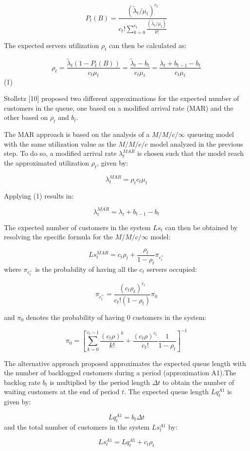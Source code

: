 $$ P_t(B) = \frac{(\widetilde{\lambda}_t / \mu_t)^{c_t}}{c_t!\sum_{k=0}^{c_t} \frac{(\widetilde{\lambda}_t / \mu_t)}{k!} } $$

The expected servers utilization $ \rho_t $ can then be calculated as:

$$ \rho_t = \frac{\widetilde{\lambda}_t(1 - P_t(B))}{c_t\mu_t} = \frac{\widetilde{\lambda}_t - b_t}{c_t\mu_t} = \frac{\lambda_t + b_{t-1} - b_t}{c_t\mu_t} $$ (1)

Stolletz [10] proposed two different approximations for the expected number of customers in the queue, one based on a modified arrival rate (MAR) and the other based on $ \rho_t $ and $ b_t $.

The MAR approach is based on the analysis of a $ M/M/c/\infty $ queueing model with the same utilization value as the $ M/M/c/c $ model analyzed in the previous step. To do so, a modified arrival rate $ \lambda_t^{MAR} $ is chosen such that the model reach the approximated utilization $ \rho_t $, given by:

$$ \lambda_t^{MAR} = \rho_t c_t \mu_t $$

Applying (1) results in:

$$ \lambda_t^{MAR} = \lambda_t + b_{t-1} - b_t $$

The expected number of customers in the system $ Ls_t $ can then be obtained by resolving the specific formula for the $ M/M/c/\infty $ model:

$$ Ls_t^{MAR} = c_t\rho_t + \frac{\rho_t}{1-\rho_t} \pi_{c_t^+} $$
where $ \pi_{c_t^+} $ is the probability of having all the $ c_t $ servers occupied:

$$ \pi_{c_t^+} = \frac{(c_t\rho_t)^{c_t}}{c_t!(1-\rho_t)}\pi_0 $$

and $ \pi_0 $ denotes the probability of having $ 0 $ customers in the system:

$$ \pi_0 = \left[ \sum_{k=0}^{c_t-1} \frac{(c_t\rho)^k}{k!} + \frac{(c_t\rho)^{c_t}}{c_t!} \frac{1}{1-\rho_t} \right]^{-1} $$

The alternative approach proposed approximates the expected queue length with the number of backlogged customers during a period (approximation A1).The backlog rate $ b_t $ is multiplied by the period length $ \Delta t $ to obtain the number of waiting customers at the end of period $ t $. The expected queue length $ Lq_t^{A1} $ is given by:

$$ Lq_t^{A1} = b_t \Delta t $$
and the total number of customers in the system $ Ls_t^{A1} $ by:

$$ Ls_t^{A1} = Lq_t^{A1} + c_t \rho_t $$


